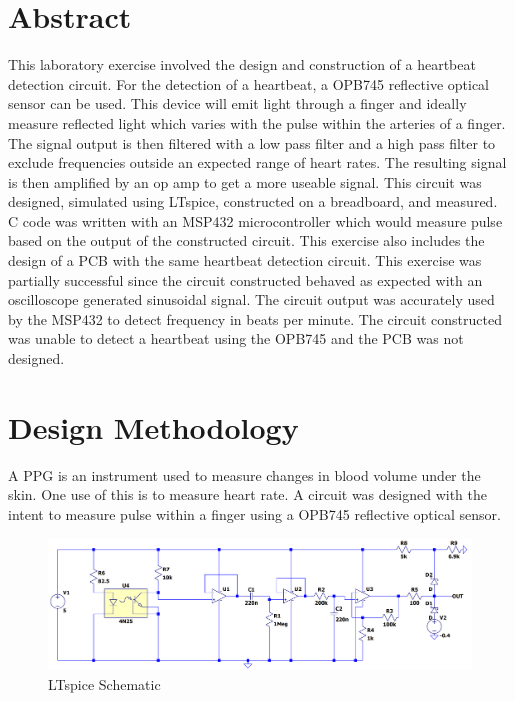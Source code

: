 \documentclass[CMPE]{KGCOEReport}
\begin{document}
\maketitle

\section*{Abstract}

This laboratory exercise involved the design and construction of a heartbeat detection circuit. For the detection of a heartbeat, a OPB745 reflective optical sensor can be used. This device will emit light through a finger and ideally measure reflected light which varies with the pulse within the arteries of a finger. The signal output is then filtered with a low pass filter and a high pass filter to exclude frequencies outside an expected range of heart rates. The resulting signal is then amplified by an op amp to get a more useable signal. This circuit was designed, simulated using LTspice, constructed on a breadboard, and measured. C code was written with an MSP432 microcontroller which would measure pulse based on the output of the constructed circuit. This exercise also includes the design of a PCB with the same heartbeat detection circuit. This exercise was partially successful since the circuit constructed behaved as expected with an oscilloscope generated sinusoidal signal. The circuit output was accurately used by the MSP432 to detect frequency in beats per minute. The circuit constructed was unable to detect a heartbeat using the OPB745 and the PCB was not designed.

\section*{Design Methodology}

A PPG is an instrument used to measure changes in blood volume under the skin. One use of this is to measure heart rate. A circuit was designed with the intent to measure pulse within a finger using a OPB745 reflective optical sensor.

\begin{figure}[H]
    \centering
    \includegraphics[width=1\textwidth]{LTspiceCompleteSchematic.png}
    \caption{LTspice Schematic}
    \label{fig:ltspiceCompleteSchematic}
\end{figure}
\end{document}

